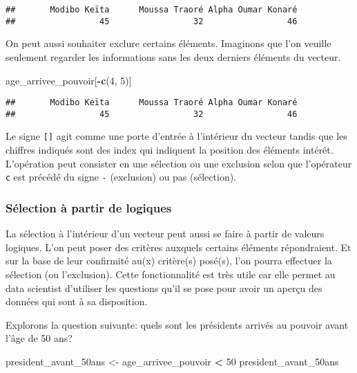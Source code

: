 \documentclass[]{book}
\newenvironment{Shaded}{\begin{snugshade}}{\end{snugshade}}
\newcommand{\KeywordTok}[1]{\textcolor[rgb]{0.13,0.29,0.53}{\textbf{#1}}}
\newcommand{\DecValTok}[1]{\textcolor[rgb]{0.00,0.00,0.81}{#1}}
\newcommand{\StringTok}[1]{\textcolor[rgb]{0.31,0.60,0.02}{#1}}
\newcommand{\OperatorTok}[1]{\textcolor[rgb]{0.81,0.36,0.00}{\textbf{#1}}}
\newcommand{\NormalTok}[1]{#1}
\begin{document}
\begin{verbatim}
##       Modibo Keïta      Moussa Traoré Alpha Oumar Konaré 
##                 45                 32                 46
\end{verbatim}

On peut aussi souhaiter exclure certains éléments. Imaginons que l'on
veuille seulement regarder les informations sans les deux derniers
éléments du vecteur.

\begin{Shaded}
\begin{Highlighting}[]
\NormalTok{age_arrivee_pouvoir[}\OperatorTok{-}\KeywordTok{c}\NormalTok{(}\DecValTok{4}\NormalTok{, }\DecValTok{5}\NormalTok{)]}
\end{Highlighting}
\end{Shaded}

\begin{verbatim}
##       Modibo Keïta      Moussa Traoré Alpha Oumar Konaré 
##                 45                 32                 46
\end{verbatim}

Le signe \texttt{{[}{]}} agit comme une porte d'entrée à l'intérieur du
vecteur tandis que les chiffres indiqués sont des index qui indiquent la
position des éléments intérêt. L'opération peut consister en une
sélection ou une exclusion selon que l'opérateur \texttt{c} est précédé
du signe \texttt{-} (exclusion) ou pas (sélection).

\subsubsection{Sélection à partir de
logiques}\label{selection-a-partir-de-logiques}

La sélection à l'intérieur d'un vecteur peut aussi se faire à partir de
valeurs logiques. L'on peut poser des critères auxquels certains
éléments répondraient. Et sur la base de leur confirmité au(x)
critère(s) posé(s), l'on pourra effectuer la sélection (ou l'exclusion).
Cette fonctionnalité est très utile car elle permet au data scientist
d'utiliser les questions qu'il se pose pour avoir un aperçu des données
qui sont à sa disposition.

Explorons la question suivante: quels sont les présidents arrivés au
pouvoir avant l'âge de 50 ans?

\begin{Shaded}
\begin{Highlighting}[]
\NormalTok{president_avant_50ans <-}\StringTok{ }\NormalTok{age_arrivee_pouvoir }\OperatorTok{<}\StringTok{ }\DecValTok{50}
\NormalTok{president_avant_50ans}
\end{Highlighting}
\end{Shaded}
\end{document}
